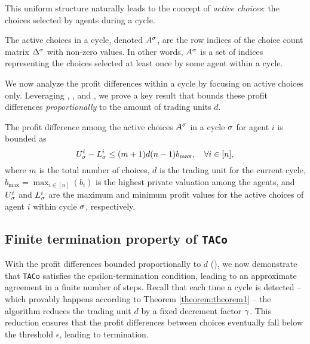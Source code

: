 This uniform structure naturally leads to the concept of \emph{active choices}: the choices selected by agents during a cycle.

\begin{definition} The active choices in a cycle, denoted $A^\sigma$, are the row indices of the choice count matrix $\Delta^\sigma$ with non-zero values.  In other words, $A^\sigma$ is a set of indices representing the choices selected at least once by some agent within a cycle.
\end{definition}

We now analyze the profit differences within a cycle by focusing on active choices only. Leveraging , , and , we prove a key result that bounds these profit differences \textit{proportionally} to the amount of trading units $d$.

\begin{theorem} \label{theorem:theorem2}
The profit difference among the active choices $A^\sigma$ in a cycle $\sigma$ for agent $i$ is bounded as 
\begin{equation} \label{eq:profDiff_Theorem2}
U_\sigma^i - L_\sigma^i \leq (m+1)d(n-1)b_{\max},\quad \forall i \in [n],
\end{equation}
where $m$ is the total number of choices, $d$ is the trading unit for the current cycle, $b_{\max} = \max_{i \in [n]} (b_i)$ is the highest private valuation among the agents, and $U_\sigma^i$ and $L_\sigma^i$ are the maximum and minimum profit values for the active choices of agent $i$ within cycle $\sigma$, respectively.
\end{theorem}

\subsection{Finite termination property of \texttt{TACo}}
With the profit differences bounded proportionally to $d$ (), we now demonstrate that \texttt{TACo} satisfies the epsilon-termination condition, leading to an approximate agreement in a finite number of steps. Recall that each time a cycle is detected -- which provably happens according to Theorem \ref{theorem:theorem1} -- the algorithm reduces the trading unit $d$ by a fixed decrement factor $\gamma$. This reduction ensures that the profit differences between choices eventually fall below the threshold $\epsilon$, leading to termination.


